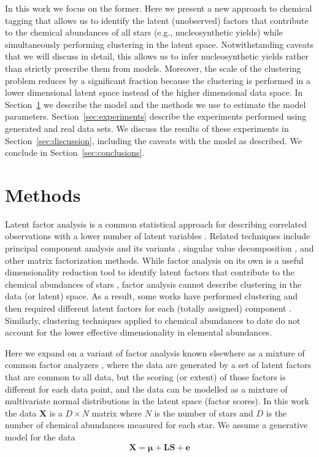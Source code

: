 \documentclass[twocolumn]{aastex62}
\newcommand{\vect}[1]{\boldsymbol{\mathbf{#1}}}
\renewcommand{\vec}[1]{\vect{#1}}
\newcommand{\vecdataunscaled}{\vec{X}}
\newcommand{\factorloads}{\textbf{L}}
\newcommand{\factorscores}{\textbf{S}}
\newcommand{\NumData}{N}
\newcommand{\NumDimensions}{D}
\begin{document}
In this work we focus on the former.
Here we present a new approach to chemical tagging that allows us to identify 
the latent (unobserved) factors that contribute to the chemical abundances of 
all stars (e.g., nucleosynthetic yields) while simultaneously performing 
clustering in the latent space. Notwithstanding caveats that we will
discuss in detail, this allows us to infer nucleosynthetic yields rather than
strictly prescribe them from models. Moreover, the scale of the clustering
problem reduces by a significant fraction because the clustering is performed in
a lower dimensional latent space instead of the higher dimensional data space.
In Section~\ref{sec:methods} we describe the model and the methods we use to
estimate the model parameters. Section~\ref{sec:experiments} describe the 
experiments performed using generated and real data sets. We discuss the results
of these experiments in Section~\ref{sec:discussion}, including the caveats with
the model as described. We conclude in Section~\ref{sec:conclusions}.



\section{Methods} \label{sec:methods}

Latent factor analysis is a common statistical approach for describing correlated 
observations with a lower number of latent variables \citep[e.g.,][]{Thompson:2004}.
Related techniques include principal component analysis \citep{Hotelling:1933} and its
variants \citep{Tipping;Bishop:1999}, singular value decomposition \citep{Golub:1970}, and other
matrix factorization methods. While factor analysis on its own is a useful
dimensionality reduction tool to identify latent factors that contribute to
the chemical abundances of stars \citep[e.g.,][]{Ting:2012,Price-Jones:2018,Milosavljevic:2018}, factor
analysis cannot describe clustering in the data (or latent) space. As a result,
some works have performed clustering and then required different latent factors for each (totally assigned) component \citep[e.g.,][]{EdwardsDowe1998}.
Similarly, clustering techniques applied to chemical abundances to date 
\citep[e.g.,][]{Hogg:2016} do not account for the lower effective dimensionality in
elemental abundances.

Here we expand on a variant of factor analysis known elsewhere as a mixture of common 
factor analyzers \citep{Baek:2010}, where the data are generated by a set of 
latent factors that are common to all data, but the scoring (or extent) of those
factors is different for each data point, and the data can be modelled as a
mixture of multivariate normal distributions in the latent space (factor scores).
In this work the data $\vecdataunscaled$ is a 
$\NumDimensions \times \NumData$ matrix where $\NumData$ is the number of 
stars and $\NumDimensions$ is the number of chemical abundances measured 
for each star. We assume a generative model for the data 
\begin{equation}
	\vecdataunscaled = \vec\mu + \factorloads\factorscores + \vec{e}
	\label{eq:generative-model}
\end{equation}
\end{document}
